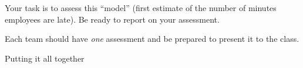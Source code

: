 \hfill


Your task is to assess this ``model'' (first estimate of the number of minutes employees are late). Be ready to report on your assessment.

\begin{teamwork}
Each team should have \emph{one} assessment and be prepared to present it to the class.	
\end{teamwork}



















\standardonlynewpage


%
%



\begin{module}{Putting it all together}
	\label{report}

	
	
\end{module}



